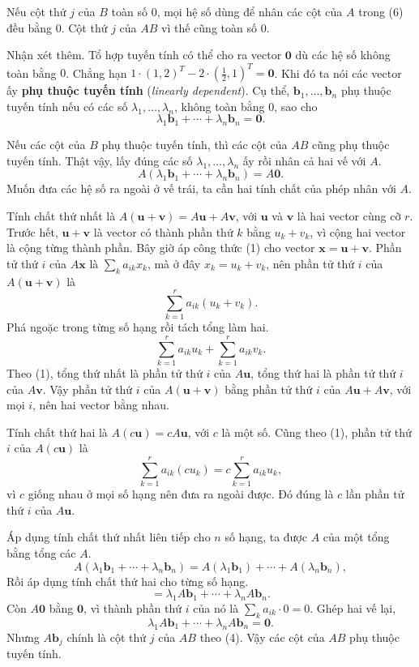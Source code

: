 \documentclass[12pt,a4paper]{article}
\begin{document}
Nếu cột thứ \(j\) của \(B\) toàn số \(0\), mọi hệ số dùng để nhân các cột của \(A\) trong (6) đều bằng \(0\). Cột thứ \(j\) của \(AB\) vì thế cũng toàn số \(0\).

Nhận xét thêm. Tổ hợp tuyến tính có thể cho ra vector \(\mathbf{0}\) dù các hệ số không toàn bằng \(0\). Chẳng hạn \(1\cdot(1,2)^T-2\cdot(\tfrac12,1)^T=\mathbf{0}\). Khi đó ta nói các vector ấy \textbf{phụ thuộc tuyến tính} (\emph{linearly dependent}). Cụ thể, \(\mathbf{b}_1,\ldots,\mathbf{b}_n\) phụ thuộc tuyến tính nếu có các số \(\lambda_1,\ldots,\lambda_n\), không toàn bằng \(0\), sao cho
$$
\lambda_1\mathbf{b}_1+\cdots+\lambda_n\mathbf{b}_n=\mathbf{0}.
$$

Nếu các cột của \(B\) phụ thuộc tuyến tính, thì các cột của \(AB\) cũng phụ thuộc tuyến tính. Thật vậy, lấy đúng các số \(\lambda_1,\ldots,\lambda_n\) ấy rồi nhân cả hai vế với \(A\).
$$
A(\lambda_1\mathbf{b}_1+\cdots+\lambda_n\mathbf{b}_n)=A\mathbf{0}.
$$
Muốn đưa các hệ số ra ngoài ở vế trái, ta cần hai tính chất của phép nhân với \(A\).

Tính chất thứ nhất là \(A(\mathbf{u}+\mathbf{v})=A\mathbf{u}+A\mathbf{v}\), với \(\mathbf{u}\) và \(\mathbf{v}\) là hai vector cùng cỡ \(r\). Trước hết, \(\mathbf{u}+\mathbf{v}\) là vector có thành phần thứ \(k\) bằng \(u_k+v_k\), vì cộng hai vector là cộng từng thành phần. Bây giờ áp công thức (1) cho vector \(\mathbf{x}=\mathbf{u}+\mathbf{v}\). Phần tử thứ \(i\) của \(A\mathbf{x}\) là \(\sum_k a_{ik}x_k\), mà ở đây \(x_k=u_k+v_k\), nên phần tử thứ \(i\) của \(A(\mathbf{u}+\mathbf{v})\) là
$$
\sum_{k=1}^{r}a_{ik}(u_k+v_k).
$$
Phá ngoặc trong từng số hạng rồi tách tổng làm hai.
$$
\sum_{k=1}^{r}a_{ik}u_k+\sum_{k=1}^{r}a_{ik}v_k.
$$
Theo (1), tổng thứ nhất là phần tử thứ \(i\) của \(A\mathbf{u}\), tổng thứ hai là phần tử thứ \(i\) của \(A\mathbf{v}\). Vậy phần tử thứ \(i\) của \(A(\mathbf{u}+\mathbf{v})\) bằng phần tử thứ \(i\) của \(A\mathbf{u}+A\mathbf{v}\), với mọi \(i\), nên hai vector bằng nhau.

Tính chất thứ hai là \(A(c\mathbf{u})=cA\mathbf{u}\), với \(c\) là một số. Cũng theo (1), phần tử thứ \(i\) của \(A(c\mathbf{u})\) là
$$
\sum_{k=1}^{r}a_{ik}(cu_k)=c\sum_{k=1}^{r}a_{ik}u_k,
$$
vì \(c\) giống nhau ở mọi số hạng nên đưa ra ngoài được. Đó đúng là \(c\) lần phần tử thứ \(i\) của \(A\mathbf{u}\).

Áp dụng tính chất thứ nhất liên tiếp cho \(n\) số hạng, ta được \(A\) của một tổng bằng tổng các \(A\).
$$
A(\lambda_1\mathbf{b}_1+\cdots+\lambda_n\mathbf{b}_n)
=A(\lambda_1\mathbf{b}_1)+\cdots+A(\lambda_n\mathbf{b}_n),
$$
Rồi áp dụng tính chất thứ hai cho từng số hạng.
$$
=\lambda_1A\mathbf{b}_1+\cdots+\lambda_nA\mathbf{b}_n.
$$
Còn \(A\mathbf{0}\) bằng \(\mathbf{0}\), vì thành phần thứ \(i\) của nó là \(\sum_k a_{ik}\cdot 0=0\). Ghép hai vế lại,
$$
\lambda_1A\mathbf{b}_1+\cdots+\lambda_nA\mathbf{b}_n=\mathbf{0}.
$$
Nhưng \(A\mathbf{b}_j\) chính là cột thứ \(j\) của \(AB\) theo (4). Vậy các cột của \(AB\) phụ thuộc tuyến tính.
\end{document}
